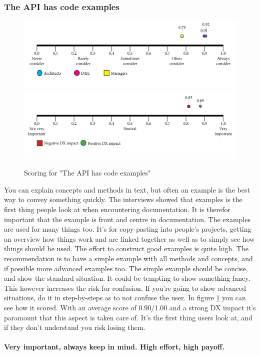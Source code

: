 \documentclass{article}
\begin{document}
\subsubsection{The API has code examples}
\begin{figure}[H]
\centering
\includegraphics[width=\linewidth]{scorelines/aspect4.png}
\includegraphics[width=\linewidth]{dxscorelines/dxaspect4.png}
\caption{Scoring for "The API has code examples"}
\label{fig:aspect4}
\end{figure}
You can explain concepts and methods in text, but often an example is the best way to convey something quickly. The interviews showed that examples is the first thing people look at when encountering documentation. It is therefor important that the example is front and centre in documentation. The examples are used for many things too. It's for copy-pasting into people's projects, getting an overview how things work and are linked together as well as to simply see how things should be used. The effort to construct good examples is quite high. The recommendation is to  have a simple example with all methods and concepts, and if possible more advanced examples too. The simple example should be concise, and show the standard situation. It could be tempting to show something fancy. This however increases the risk for confusion. If you're going to show advanced situations, do it in step-by-steps as to not confuse the user. In figure \ref{fig:aspect4} you can see how it scored. With an average score of 0.90/1.00 and a strong DX impact it's paramount that this aspect is taken care of. It's the first thing users look at, and if they don't understand you risk losing them. \\ \\
\textbf{Very important, always keep in mind. High effort, high payoff.}
\end{document}
